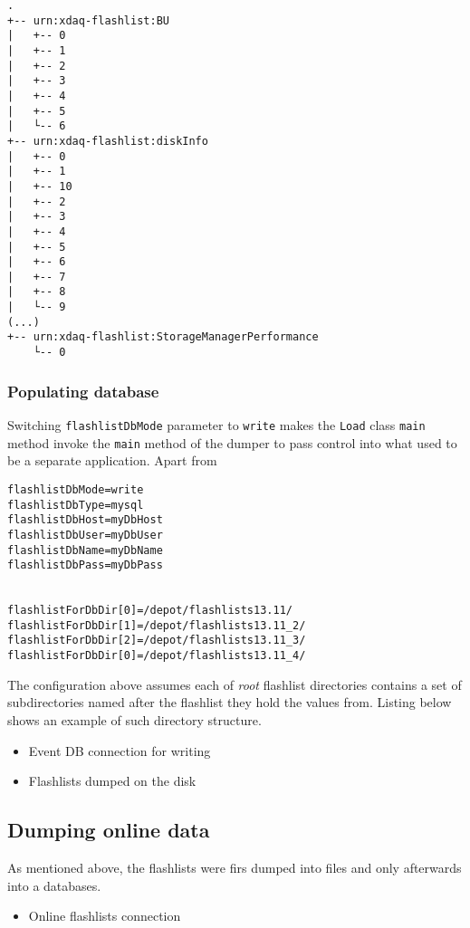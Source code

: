 \begin{lstlisting}[caption={Sample directory structure of dumped flashlists data}]
.
+-- urn:xdaq-flashlist:BU
|   +-- 0
|   +-- 1
|   +-- 2
|   +-- 3
|   +-- 4
|   +-- 5
|   └-- 6
+-- urn:xdaq-flashlist:diskInfo
|   +-- 0
|   +-- 1
|   +-- 10
|   +-- 2
|   +-- 3
|   +-- 4
|   +-- 5
|   +-- 6
|   +-- 7
|   +-- 8
|   └-- 9
(...)
+-- urn:xdaq-flashlist:StorageManagerPerformance
    └-- 0

\end{lstlisting}

\subsubsection{Populating database}
Switching \texttt{flashlistDbMode} parameter to \texttt{write} makes the \texttt{Load} class \texttt{main} method invoke the \texttt{main} method of the dumper to pass control into what used to be a separate application. 
Apart from 

\begin{lstlisting}
flashlistDbMode=write
flashlistDbType=mysql
flashlistDbHost=myDbHost
flashlistDbUser=myDbUser
flashlistDbName=myDbName
flashlistDbPass=myDbPass


flashlistForDbDir[0]=/depot/flashlists13.11/
flashlistForDbDir[1]=/depot/flashlists13.11_2/
flashlistForDbDir[2]=/depot/flashlists13.11_3/
flashlistForDbDir[0]=/depot/flashlists13.11_4/
\end{lstlisting}

The configuration above assumes each of \emph{root} flashlist directories contains a set of subdirectories named after the flashlist they hold the values from. Listing below shows an example of such directory structure.





	\begin{itemize}
		\item Event DB connection for writing
		\item Flashlists dumped on the disk
	\end{itemize}
\subsection{Dumping online data}
As mentioned above, the flashlists were firs dumped into files and only afterwards into a databases.
	\begin{itemize}
		\item Online flashlists connection
	\end{itemize}


